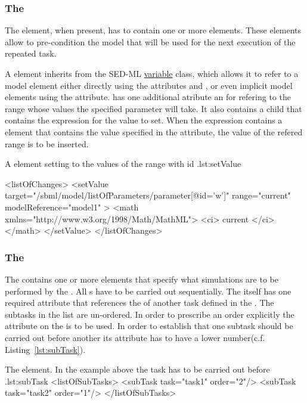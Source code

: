 \subsubsection{ The }
\label{class:changes}
\label{class:setValue}

The  element, when present, has to contain one or more  elements. These elements allow to pre-condition the model that will be used for the next execution of the repeated task. 

A  element inherits from the SED-ML \hyperref[class:variable]{variable} class, which allows it to refer to a model element either directly using the attributes  and , or even implicit model elements using the  attribute.  has one additional atribute  an for refering to the range whose values the specified parameter will take. It also contains a child  that contains the expression for the value to set. When the expression contains a  element that contains the value specified in the  attribute, the value of the refered range is to be inserted. 

\begin{myXmlLst}{A  element setting  to the values of the range with id .}{lst:setValue}

  <listOfChanges>
    <setValue target="/sbml/model/listOfParameters/parameter[@id='w']" range="current" modelReference="model1" > 
     <math xmlns="http://www.w3.org/1998/Math/MathML"> 
         <ci> current </ci> 
     </math> 
    </setValue> 
  </listOfChanges>
\end{myXmlLst}


\subsubsection{ The }
\label{class:subTasks}
The  contains one or more  elements that specify what simulations are to be performed by the . All s have to be carried out sequentially. The  itself has one required attribute  that references the  of another task defined in the . The subtasks in the list are un-ordered.  In order to prescribe an order explicitly the  attribute on the  is to be used. In order to establish that one subtask should be carried out before another its  attribute has to have a lower number(c.f. Listing~\ref{lst:subTask}).  

\begin{myXmlLst}{The  element. In the example above the task  has to be carried out before .}{lst:subTask}
  <listOfSubTasks>
    <subTask task="task1" order="2"/> 
    <subTask task="task2" order="1"/> 
  </listOfSubTasks>
\end{myXmlLst}

 


